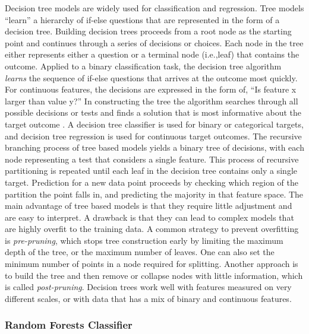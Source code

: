\documentclass[sigconf]{acmart}
\begin{document}
Decision tree models are widely used for classification and regression. Tree 
models ``learn'' a hierarchy of if-else questions that are represented in the
form of a decision tree. Building decision trees proceeds from a root node as 
the starting point and continues through a series of decisions or choices.
Each node in the tree either represents either a question or a terminal node 
(i.e.,leaf) that contains the outcome. Applied to a binary classification task, 
the decision tree algorithm \emph{learns} the sequence of if-else questions 
that arrives at the outcome most quickly. For continuous features, the 
decisions are expressed in the form of, ``Is feature x larger than value y?''
 In constructing the tree the algorithm searches through all
possible decisions or tests and finds a solution that is most informative 
about the target outcome \cite{muller17}. A decision tree classifier is used 
for binary or categorical targets, and decision tree regression is used for 
continuous target outcomes. The recursive branching process of tree based 
models yields a binary tree of decisions, with each node representing a test 
that considers a single feature. This process of recursive partitioning is 
repeated until each leaf in the decision tree contains only a single target. 
Prediction for a new data point proceeds by checking which region of the 
partition the point falls in, and predicting the majority in that feature space. 
The main advantage of tree based models is that they require little adjustment 
and are easy to interpret. A drawback is that they can lead to complex models 
that are highly overfit to the training data. A common strategy to prevent 
overfitting is \emph{pre-pruning}, which stops tree construction early by 
limiting the maximum depth of the tree, or the maximum number of leaves. 
One can also set the minimum number of points in a node required for splitting. 
Another approach is to build the tree and then remove or collapse nodes with 
little information, which is called \emph{post-pruning}. Decision trees work 
well with features measured on very different scales, or with data that has 
a mix of binary and continuous features. 

\subsubsection{Random Forests Classifier}
\end{document}
